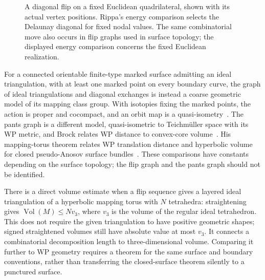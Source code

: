 \begin{figure}[htbp]
\caption[A diagonal exchange and the Delaunay energy comparison]{A diagonal flip on a fixed Euclidean quadrilateral, shown
with its actual vertex positions. Rippa's energy comparison selects the
Delaunay diagonal for fixed nodal values. The same combinatorial move
also occurs in flip graphs used in surface topology; the displayed
energy comparison concerns the fixed Euclidean realization.}
\label{fig:mono-flip}
\end{figure}

For a connected orientable finite-type marked surface admitting an ideal
triangulation, with at least one marked point on every boundary curve,
the graph of ideal triangulations and diagonal exchanges is instead
a coarse geometric model of its mapping class group. With isotopies
fixing the marked points, the action is proper and cocompact, and an
orbit map is a quasi-isometry~\cite[Section~2.1, Lemma~2.3]{DisarloParlier}.
The pants graph is a different
model, quasi-isometric to Teichm\"uller space with its WP metric, and
Brock relates WP distance to convex-core volume~\cite{BrockWPVolumes}.
His mapping-torus theorem relates WP translation distance and hyperbolic
volume for closed pseudo-Anosov surface bundles~\cite{BrockMappingTori}.
These comparisons have constants depending on the surface topology;
the flip graph and the pants graph should not be identified.

There is a direct volume estimate when a flip sequence gives a layered
ideal triangulation of a hyperbolic mapping torus with $N$ tetrahedra:
straightening gives $\operatorname{Vol}(M)\le Nv_3$, where $v_3$ is the
volume of the regular ideal tetrahedron. This does not require the
given triangulation to have positive geometric shapes; signed
straightened volumes still have absolute value at most $v_3$.
It connects a combinatorial decomposition length to three-dimensional
volume. Comparing it further to WP geometry requires a theorem for the
same surface and boundary conventions, rather than transferring the
closed-surface theorem silently to a punctured surface.

